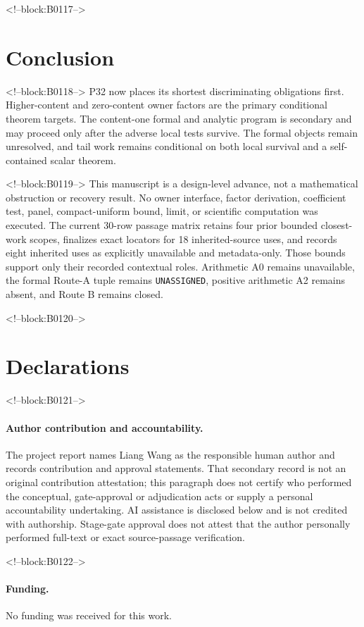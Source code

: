 \documentclass[11pt]{article}
\begin{document}
<!--block:B0117-->
\hypertarget{10-conclusion}{%
\section{Conclusion}\label{10-conclusion}}

<!--block:B0118-->
P32 now places its shortest discriminating obligations first.
Higher-content and zero-content owner factors are the primary
conditional theorem targets. The content-one formal and analytic program
is secondary and may proceed only after the adverse local tests survive.
The formal objects remain unresolved, and tail work remains conditional
on both local survival and a self-contained scalar theorem.

<!--block:B0119-->
This manuscript is a design-level advance, not a mathematical
obstruction or recovery result. No owner interface, factor derivation, coefficient
test, panel, compact-uniform bound, limit, or scientific computation was executed.
The current 30-row passage matrix retains four prior bounded closest-work scopes,
finalizes exact locators for 18 inherited-source uses, and records eight inherited
uses as explicitly unavailable and metadata-only. Those bounds support only their
recorded contextual roles. Arithmetic A0 remains unavailable, the formal Route-A
tuple remains \texttt{UNASSIGNED}, positive arithmetic A2 remains absent, and Route B
remains closed.

<!--block:B0120-->
\section*{Declarations}

<!--block:B0121-->
\paragraph{Author contribution and accountability.}
The project report names Liang Wang as the responsible human author and records
contribution and approval statements. That secondary record is not an original
contribution attestation; this paragraph does not certify who performed the
conceptual, gate-approval or adjudication acts or supply a personal accountability
undertaking. AI assistance is disclosed below and is not credited with authorship.
Stage-gate approval does not attest that the author personally performed full-text
or exact source-passage verification.

<!--block:B0122-->
\paragraph{Funding.} No funding was received for this work.
\end{document}

